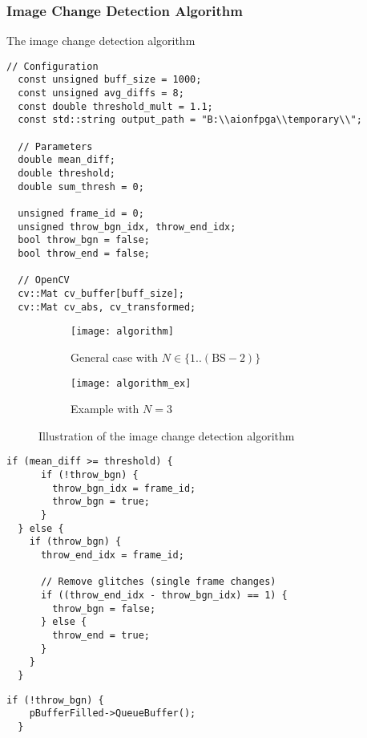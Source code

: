 \subsubsection{Image Change Detection Algorithm}
\label{subsubsec:algorithm}

The image change detection algorithm


\begin{lstlisting}[style=C++]
  // Configuration
  const unsigned buff_size = 1000;
  const unsigned avg_diffs = 8;
  const double threshold_mult = 1.1;
  const std::string output_path = "B:\\aionfpga\\temporary\\";

  // Parameters
  double mean_diff;
  double threshold;
  double sum_thresh = 0;

  unsigned frame_id = 0;
  unsigned throw_bgn_idx, throw_end_idx;
  bool throw_bgn = false;
  bool throw_end = false;

  // OpenCV
  cv::Mat cv_buffer[buff_size];
  cv::Mat cv_abs, cv_transformed;
\end{lstlisting}

\begin{figure}[H]
  \centering
  \begin{subfigure}[b]{\textwidth}
    \texttt{[image: algorithm]}
    \caption{General case with $N \in \{1..(\text{BS}-2)\}$}
    \label{subfig:algorithm_general_case}
  \end{subfigure}
  \begin{subfigure}[b]{\textwidth}
    \texttt{[image: algorithm\_ex]}
    \caption{Example with $N = 3$}
    \label{subfig:algorithm_example}
  \end{subfigure}
  \caption{Illustration of the image change detection algorithm}
  \label{fig:change_detection_algorithm}
\end{figure}

\begin{lstlisting}[style=C++]
  if (mean_diff >= threshold) {
      if (!throw_bgn) {
        throw_bgn_idx = frame_id;
        throw_bgn = true;
      }
  } else {
    if (throw_bgn) {
      throw_end_idx = frame_id;

      // Remove glitches (single frame changes)
      if ((throw_end_idx - throw_bgn_idx) == 1) {
        throw_bgn = false;
      } else {
        throw_end = true;
      }
    }
  }
\end{lstlisting}


\begin{lstlisting}[style=C++]
  if (!throw_bgn) {
    pBufferFilled->QueueBuffer();
  }
\end{lstlisting}
